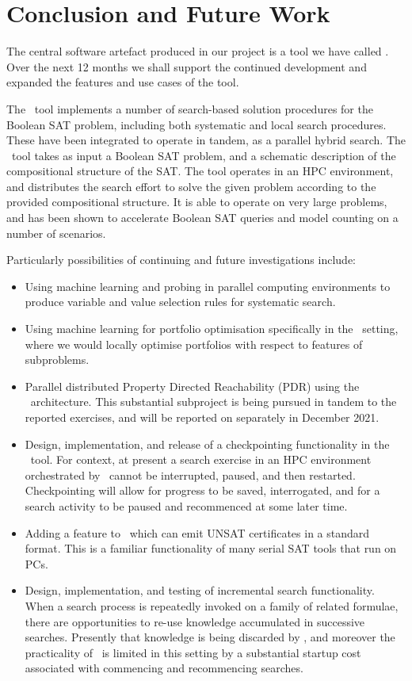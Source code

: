 \documentclass[
10pt, %
a4paper, %
oneside, %
headinclude,footinclude, %
BCOR5mm, %
]{scrartcl}
\begin{document}
\section{Conclusion and Future Work}

 
The central software artefact produced in our project is a tool we have called \dagster.
Over the next 12 months we shall support the continued development and expanded the features and use cases of the tool. 

The \dagster\ tool implements a number of search-based solution procedures for the Boolean SAT problem, including both systematic and local search procedures.
These have been integrated to operate in tandem, as a parallel hybrid search.
The \dagster\ tool takes as input a Boolean SAT problem, and a schematic description of the compositional structure of the SAT.
The tool operates in an HPC environment, and  distributes the search effort to solve the given problem according to the provided compositional structure.
It is able to operate on very large problems, and has been shown to accelerate Boolean SAT queries and model counting on a number of scenarios.

Particularly possibilities of continuing and future investigations include:
\begin{itemize}
\item Using machine learning and probing in parallel computing environments to produce variable and value selection rules for systematic search.  
\item Using machine learning for portfolio optimisation specifically in the \dagster\ setting, where we would locally optimise portfolios with respect to features of subproblems. 
\item Parallel distributed Property Directed Reachability (PDR) using the \dagster\ architecture. This substantial subproject is being pursued in tandem to the reported exercises, and will be reported on separately  in December 2021. 
\item Design, implementation, and release of a checkpointing functionality in the \dagster\ tool. For context, at present a search exercise in an HPC environment orchestrated by \dagster\ cannot be interrupted, paused, and then restarted. Checkpointing will allow for progress to be saved, interrogated, and for a search activity to be paused and recommenced at some later time. 
\item Adding a feature to \dagster\ which can emit UNSAT certificates in a standard format. This is a familiar functionality of many serial SAT tools that run on PCs.  
\item Design, implementation, and testing of incremental search functionality. When a search process is repeatedly invoked on a family of related formulae, there are opportunities to re-use knowledge accumulated in successive searches. Presently that knowledge is being discarded by \dagster, and moreover the practicality of \dagster\ is limited in this setting by a substantial startup cost associated with commencing and recommencing searches.
\end{itemize}
\end{document}
